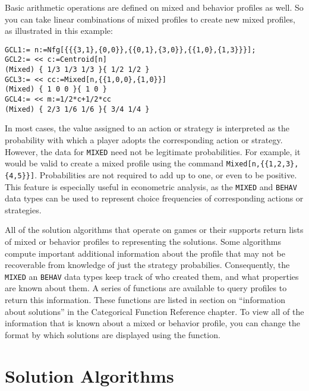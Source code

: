 Basic arithmetic operations are defined on mixed and behavior profiles
as well.  So you can take linear combinations of mixed profiles to
create new mixed profiles, as illustrated in this example:

\begin{verbatim}  
GCL1:= n:=Nfg[{{{3,1},{0,0}},{{0,1},{3,0}},{{1,0},{1,3}}}];
GCL2:= << c:=Centroid[n]
(Mixed) { 1/3 1/3 1/3 }{ 1/2 1/2 }
GCL3:= << cc:=Mixed[n,{{1,0,0},{1,0}}]
(Mixed) { 1 0 0 }{ 1 0 }
GCL4:= << m:=1/2*c+1/2*cc
(Mixed) { 2/3 1/6 1/6 }{ 3/4 1/4 }
\end{verbatim}

In most cases, the value assigned to an action or strategy is
interpreted as the probability with which a player adopts the
corresponding action or strategy.  However, the data for \verb+MIXED+
need not be legitimate probabilities.  For example, it would be valid
to create a mixed profile using the command
\verb+Mixed[n,{{1,2,3},{4,5}}]+.  Probabilities are not
required to add up to one, or even to be positive.  This feature is
especially useful in econometric analysis, as the \verb+MIXED+ and
\verb+BEHAV+ data types can be used to represent choice frequencies of
corresponding actions or strategies.  

All of the solution algorithms that operate on games or their supports
return lists of mixed or behavior profiles to representing the
solutions.  Some algorithms compute important additional information
about the profile that may not be recoverable from knowledge of just
the strategy probabilies.  Consequently, the \verb+MIXED+ an
\verb+BEHAV+ data types keep track of who created them, and what
properties are known about them.  A series of functions are available
to query profiles to return this information.  These functions are
listed in section on ``information about solutions'' in the
Categorical Function Reference chapter.  To view all of the
information that is known about a mixed or behavior profile, you can
change the format by which solutions are displayed using the
 function.

\section{Solution Algorithms}

\subsection{}

